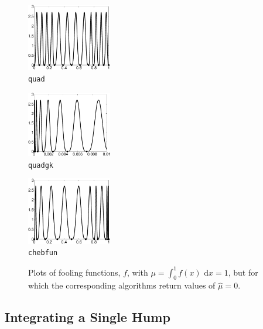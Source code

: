 \documentclass[graybox]{svmult}
\newcommand{\rd}{\,\mathrm{d}}
\newcommand{\hmu}{\hat{\mu}}
\newcommand{\dif}{\rd}
\begin{document}
\begin{figure}
\centering
\begin{minipage}{3.7cm} \centering \includegraphics[width=3.7cm]{Foolquadbw.eps} \\ {\tt quad} \end{minipage}
\begin{minipage}{3.7cm} \centering \includegraphics[width=3.7cm]{Foolquadgkbw.eps} \\ {\tt quadgk} \end{minipage}
\begin{minipage}{3.7cm} \centering \includegraphics[width=3.7cm]{Foolchebintbw.eps} \\ {\tt chebfun} \end{minipage}
\caption{Plots of fooling functions, $f$, with $\mu=\int_0^1 f(x) \, \dif x=1$, but for which the corresponding algorithms return values of $\hmu=0$. \label{foolfunfig}}
\end{figure}

\subsection{Integrating a Single Hump}
\end{document}
